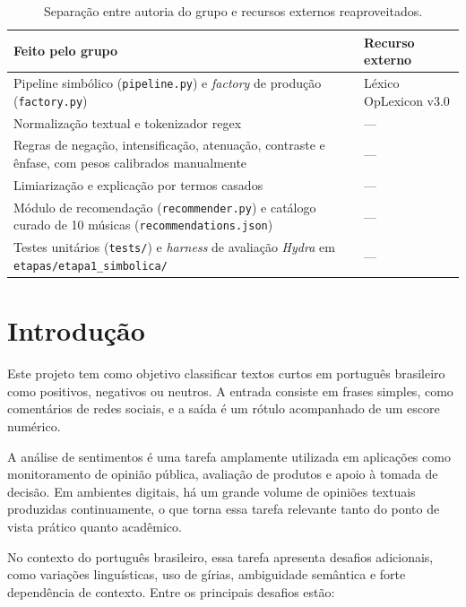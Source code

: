 \documentclass[11pt,a4paper]{article}
\begin{document}
\begin{table}[h]
\small
\centering
\begin{tabularx}{\linewidth}{@{}L{5.4cm}Y@{}}
\toprule
\textbf{Feito pelo grupo} & \textbf{Recurso externo} \\
\midrule
Pipeline simbólico (\texttt{pipeline.py}) e \emph{factory} de produção (\texttt{factory.py}) & Léxico OpLexicon v3.0 \citep{souza2011construction} \\
Normalização textual e tokenizador regex & --- \\
Regras de negação, intensificação, atenuação, contraste e ênfase, com pesos calibrados manualmente & --- \\
Limiarização e explicação por termos casados & --- \\
Módulo de recomendação (\texttt{recommender.py}) e catálogo curado de 10 músicas (\texttt{recommendations.json}) & --- \\
Testes unitários (\texttt{tests/}) e \emph{harness} de avaliação \emph{Hydra} em \texttt{etapas/etapa1\_simbolica/} & --- \\
\bottomrule
\end{tabularx}
\caption{Separação entre autoria do grupo e recursos externos reaproveitados.}
\label{tab:autoria}
\end{table}

\section{Introdução}

Este projeto tem como objetivo classificar textos curtos em português brasileiro como positivos, negativos ou neutros. A entrada consiste em frases simples, como comentários de redes sociais, e a saída é um rótulo acompanhado de um escore numérico.

A análise de sentimentos é uma tarefa amplamente utilizada em aplicações como monitoramento de opinião pública, avaliação de produtos e apoio à tomada de decisão. Em ambientes digitais, há um grande volume de opiniões textuais produzidas continuamente, o que torna essa tarefa relevante tanto do ponto de vista prático quanto acadêmico.

No contexto do português brasileiro, essa tarefa apresenta desafios adicionais, como variações linguísticas, uso de gírias, ambiguidade semântica e forte dependência de contexto. Entre os principais desafios estão:
\end{document}

